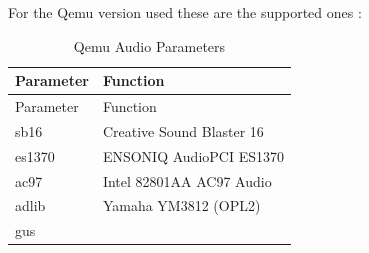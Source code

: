 \documentclass[
  14pt,
  english,
  a4paper,
]{scrreprt}
\begin{document}
For the Qemu version used these are the supported ones :

\hypertarget{tbl:qemu_audio_param}{}
\begin{longtable}[]{@{}ll@{}}
\caption{\label{tbl:qemu_audio_param}Qemu Audio
Parameters}\tabularnewline
\toprule
\begin{minipage}[b]{0.16\columnwidth}\raggedright
Parameter\strut
\end{minipage} & \begin{minipage}[b]{0.37\columnwidth}\raggedright
Function\strut
\end{minipage}\tabularnewline
\midrule
\endfirsthead
\toprule
\begin{minipage}[b]{0.16\columnwidth}\raggedright
Parameter\strut
\end{minipage} & \begin{minipage}[b]{0.37\columnwidth}\raggedright
Function\strut
\end{minipage}\tabularnewline
\midrule
\endhead
\begin{minipage}[t]{0.16\columnwidth}\raggedright
sb16\strut
\end{minipage} & \begin{minipage}[t]{0.37\columnwidth}\raggedright
Creative Sound Blaster 16\strut
\end{minipage}\tabularnewline
\begin{minipage}[t]{0.16\columnwidth}\raggedright
es1370\strut
\end{minipage} & \begin{minipage}[t]{0.37\columnwidth}\raggedright
ENSONIQ AudioPCI ES1370\strut
\end{minipage}\tabularnewline
\begin{minipage}[t]{0.16\columnwidth}\raggedright
ac97\strut
\end{minipage} & \begin{minipage}[t]{0.37\columnwidth}\raggedright
Intel 82801AA AC97 Audio\strut
\end{minipage}\tabularnewline
\begin{minipage}[t]{0.16\columnwidth}\raggedright
adlib\strut
\end{minipage} & \begin{minipage}[t]{0.37\columnwidth}\raggedright
Yamaha YM3812 (OPL2)\strut
\end{minipage}\tabularnewline
\begin{minipage}[t]{0.16\columnwidth}\raggedright
gus\strut
\end{minipage} & \begin{minipage}[t]{0.37\columnwidth}\raggedright

\end{minipage}
\end{longtable}
\end{document}
